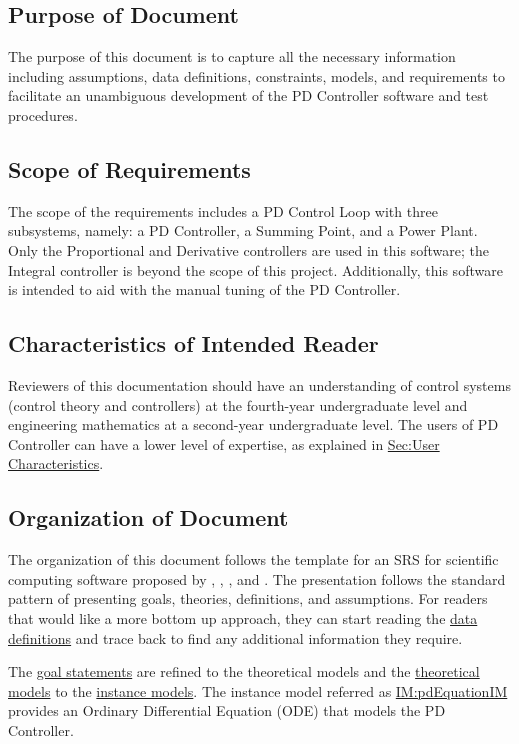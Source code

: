 \documentclass[12pt]{article}
\begin{document}
\subsection{Purpose of Document}
\label{Sec:DocPurpose}
The purpose of this document is to capture all the necessary information including assumptions, data definitions, constraints, models, and requirements to facilitate an unambiguous development of the PD Controller software and test procedures.

\subsection{Scope of Requirements}
\label{Sec:ReqsScope}
The scope of the requirements includes a PD Control Loop with three subsystems, namely: a PD Controller, a Summing Point, and a Power Plant. Only the Proportional and Derivative controllers are used in this software; the Integral controller is beyond the scope of this project. Additionally, this software is intended to aid with the manual tuning of the PD Controller.

\subsection{Characteristics of Intended Reader}
\label{Sec:ReaderChars}
Reviewers of this documentation should have an understanding of control systems (control theory and controllers) at the fourth-year undergraduate level and engineering mathematics at a second-year undergraduate level. The users of PD Controller can have a lower level of expertise, as explained in \hyperref[Sec:UserChars]{Sec:User Characteristics}.

\subsection{Organization of Document}
\label{Sec:DocOrg}
The organization of this document follows the template for an SRS for scientific computing software proposed by \cite{koothoor2013}, \cite{smithLai2005}, \cite{smithEtAl2007}, and \cite{smithKoothoor2016}. The presentation follows the standard pattern of presenting goals, theories, definitions, and assumptions. For readers that would like a more bottom up approach, they can start reading the \hyperref[Sec:IMs]{data definitions} and trace back to find any additional information they require.

The \hyperref[Sec:GoalStmt]{goal statements} are refined to the theoretical models and the \hyperref[Sec:TMs]{theoretical models} to the \hyperref[Sec:IMs]{instance models}. The instance model referred as \hyperref[IM:pdEquationIM]{IM:pdEquationIM} provides an Ordinary Differential Equation (ODE) that models the PD Controller.
\end{document}
